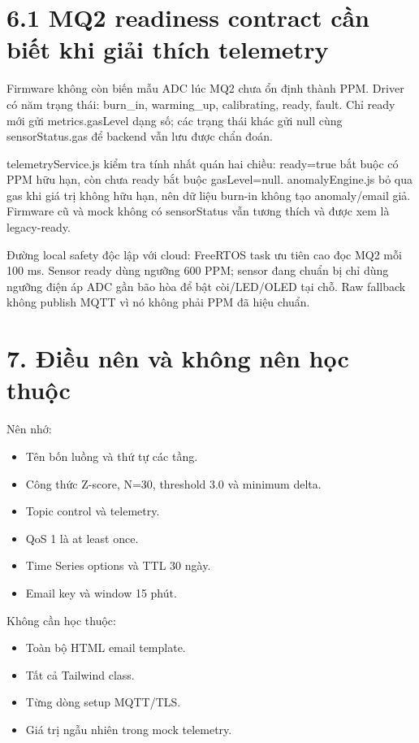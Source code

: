 \documentclass[11pt,oneside,openany]{book}
\renewcommand{\texttt}[1]{{\ttfamily\small #1}}
\providecommand{\tightlist}{\setlength{\itemsep}{1pt}\setlength{\parskip}{0pt}}
\begin{document}
\section{6.1 MQ2 readiness contract cần biết khi giải thích
telemetry}\label{61-mq2-readiness-contract-cux1ea7n-biux1ebft-khi-giux1ea3i-thuxedch-telemetry}

Firmware không còn biến mẫu ADC lúc MQ2 chưa ổn định thành PPM. Driver
có năm trạng thái: \texttt{burn\_in}, \texttt{warming\_up},
\texttt{calibrating}, \texttt{ready}, \texttt{fault}. Chỉ \texttt{ready}
mới gửi \texttt{metrics.gasLevel} dạng số; các trạng thái khác gửi
\texttt{null} cùng \texttt{sensorStatus.gas} để backend vẫn lưu được
chẩn đoán.

\texttt{telemetryService.js} kiểm tra tính nhất quán hai chiều:
\texttt{ready=true} bắt buộc có PPM hữu hạn, còn chưa ready bắt buộc
\texttt{gasLevel=null}. \texttt{anomalyEngine.js} bỏ qua gas khi giá trị
không hữu hạn, nên dữ liệu burn-in không tạo anomaly/email giả. Firmware
cũ và mock không có \texttt{sensorStatus} vẫn tương thích và được xem là
legacy-ready.

Đường local safety độc lập với cloud: FreeRTOS task ưu tiên cao đọc MQ2
mỗi 100 ms. Sensor ready dùng ngưỡng 600 PPM; sensor đang chuẩn bị chỉ
dùng ngưỡng điện áp ADC gần bão hòa để bật còi/LED/OLED tại chỗ. Raw
fallback không publish MQTT vì nó không phải PPM đã hiệu chuẩn.

\section{7. Điều nên và không nên học
thuộc}\label{7-ux111iux1ec1u-nuxean-vuxe0-khuxf4ng-nuxean-hux1ecdc-thuux1ed9c}

Nên nhớ:

\begin{itemize}
\tightlist
\item
  Tên bốn luồng và thứ tự các tầng.
\item
  Công thức Z-score, N=30, threshold 3.0 và minimum delta.
\item
  Topic control và telemetry.
\item
  QoS 1 là at least once.
\item
  Time Series options và TTL 30 ngày.
\item
  Email key và window 15 phút.
\end{itemize}

Không cần học thuộc:

\begin{itemize}
\tightlist
\item
  Toàn bộ HTML email template.
\item
  Tất cả Tailwind class.
\item
  Từng dòng setup MQTT/TLS.
\item
  Giá trị ngẫu nhiên trong mock telemetry.
\end{itemize}
\end{document}
